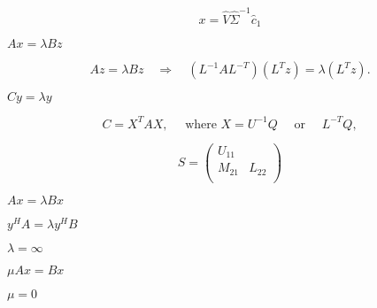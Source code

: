 {\newpage\clearpage
{}%
\begin{displaymath}
x = \hat{V} \hat{\Sigma}^{-1} \hat{c}_1
\end{displaymath}%
\lthtmldisplayZ
\lthtmlcheckvsize\clearpage}

{\newpage\clearpage
{}%
$Ax = \lambda Bz$%
\lthtmlinlinemathZ
\lthtmlcheckvsize\clearpage}

{\newpage\clearpage
{}%
\begin{displaymath}
Az=\lambda Bz \quad \Rightarrow \quad (L ^{-1}AL ^{-T})(L^Tz)= \lambda(L^Tz).
\end{displaymath}%
\lthtmldisplayZ
\lthtmlcheckvsize\clearpage}

{\newpage\clearpage
{}%
$Cy=\lambda y$%
\lthtmlinlinemathZ
\lthtmlcheckvsize\clearpage}

{\newpage\clearpage
{}%
\begin{displaymath}
C = X^T A X, \quad \mbox{ where } X = U^{-1} Q \quad \mbox{ or } \quad L^{-T} Q,
\end{displaymath}%
\lthtmldisplayZ
\lthtmlcheckvsize\clearpage}

{\newpage\clearpage
{}%
\begin{displaymath}
S = \left( \begin{array}{cc}
U_{11} &   \\
M_{21} & L_{22} \\
\end{array} \right)
\end{displaymath}%
\lthtmldisplayZ
\lthtmlcheckvsize\clearpage}

{\newpage\clearpage
{}%
$Ax = \lambda Bx$%
\lthtmlinlinemathZ
\lthtmlcheckvsize\clearpage}

{\newpage\clearpage
{}%
$y^H A = \lambda y^H B$%
\lthtmlinlinemathZ
\lthtmlcheckvsize\clearpage}

{\newpage\clearpage
{}%
$\lambda = \infty$%
\lthtmlinlinemathZ
\lthtmlcheckvsize\clearpage}

{\newpage\clearpage
{}%
$\mu Ax = Bx$%
\lthtmlinlinemathZ
\lthtmlcheckvsize\clearpage}

{\newpage\clearpage
{}%
$\mu = 0$%
\lthtmlinlinemathZ
\lthtmlcheckvsize\clearpage}

